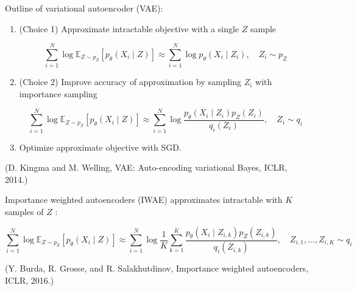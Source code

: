 \documentclass{report}
\begin{document}
\begin{concept}
    Outline of variational autoencoder (VAE):

    \begin{enumerate}
        \item
        (Choice 1) Approximate intractable objective with a single $Z$ sample

        $$
        \sum_{i=1}^{N} \log \mathbb{E}_{Z \sim p_{Z}}\left[p_{\theta}\left(X_{i} \mid Z\right)\right] \approx \sum_{i=1}^{N} \log p_{\theta}\left(X_{i} \mid Z_{i}\right), \quad Z_{i} \sim p_{Z}
        $$
        \item
        (Choice 2) Improve accuracy of approximation by sampling $Z_{i}$ with importance sampling

        $$
        \sum_{i=1}^{N} \log \mathbb{E}_{Z \sim p_{Z}}\left[p_{\theta}\left(X_{i} \mid Z\right)\right] \approx \sum_{i=1}^{N} \log \frac{p_{\theta}\left(X_{i} \mid Z_{i}\right) p_{Z}\left(Z_{i}\right)}{q_{i}\left(Z_{i}\right)}, \quad Z_{i} \sim q_{i}
        $$
        \item Optimize approximate objective with SGD.
    \end{enumerate}

    (D. Kingma and M. Welling, VAE: Auto-encoding variational Bayes, ICLR, 2014.)
\end{concept}

\begin{concept}
    Importance weighted autoencoders (IWAE) approximates intractable with $K$ samples of $Z$ :

    $$
    \sum_{i=1}^{N} \log \mathbb{E}_{Z \sim p_{Z}}\left[p_{\theta}\left(X_{i} \mid Z\right)\right] \approx \sum_{i=1}^{N} \log \frac{1}{K} \sum_{k=1}^{K} \frac{p_{\theta}\left(X_{i} \mid Z_{i, k}\right) p_{Z}\left(Z_{i, k}\right)}{q_{i}\left(Z_{i, k}\right)}, \quad Z_{i, 1}, \ldots, Z_{i, K} \sim q_{i}
    $$

    (Y. Burda, R. Grosse, and R. Salakhutdinov, Importance weighted autoencoders, ICLR, 2016.)
\end{concept}
\end{document}
